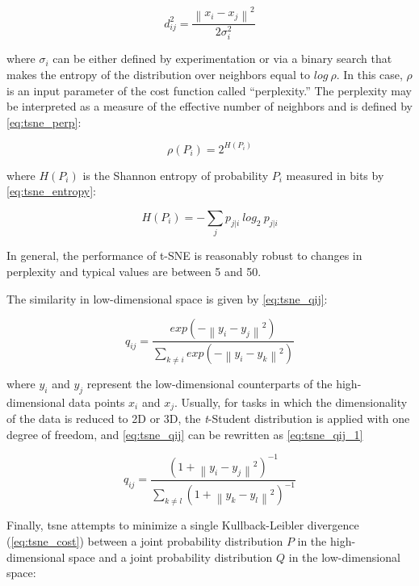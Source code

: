 \begin{equation}
\label{eq:tsne_dij}
d_{ij}^2 = \frac{\left\| x_i - x_j \right\|^2}{2\sigma_i^2}
\end{equation}

\noindent
where $\sigma_i$ can be either defined by experimentation or via a binary search that makes the entropy of the distribution over neighbors equal to $log\ \rho$. In this case, $\rho$ is an input parameter of the cost function called ``perplexity.'' The perplexity may be interpreted as a measure of the effective number of neighbors and is defined by \autoref{eq:tsne_perp}:

\begin{equation}
\label{eq:tsne_perp}
\rho(P_i) = 2^{H(P_i)}
\end{equation}

\noindent
where $H(P_i)$ is the Shannon entropy of probability $P_i$ measured in bits by \autoref{eq:tsne_entropy}:

\begin{equation}
\label{eq:tsne_entropy}
H(P_i) = -\sum_j p_{j|i}\ log_2\ p_{j|i}
\end{equation}

In general, the performance of t-SNE is reasonably robust to changes in perplexity and typical values are between 5 and 50.

The similarity in low-dimensional space is given by \autoref{eq:tsne_qij}:

\begin{equation}
\label{eq:tsne_qij}
q_{ij} = \frac{exp(-\left\| y_i - y_j \right\|^2)}{\sum_{k \neq i} exp(-\left\| y_i - y_k \right\|^2)}
\end{equation}

\noindent
where $y_i$ and $y_j$ represent the low-dimensional counterparts of the
high-dimensional data points $x_i$ and $x_j$. Usually, for tasks in which the dimensionality of the data is reduced to 2D or 3D, the \textit{t}-Student distribution is applied with one degree of freedom, and \autoref{eq:tsne_qij} can be rewritten as \autoref{eq:tsne_qij_1}

\begin{equation}
\label{eq:tsne_qij_1}
q_{ij} = \frac{(1 +\left\| y_i - y_j \right\|^2)^{-1}}{\sum_{k \neq l} (1 +\left\| y_k - y_l \right\|^2)^{-1}}
\end{equation}

Finally, \acs{tsne} attempts to minimize a single Kullback-Leibler divergence (\autoref{eq:tsne_cost}) between a joint probability distribution $P$ in the high-dimensional space and a joint probability distribution $Q$ in the low-dimensional space:

